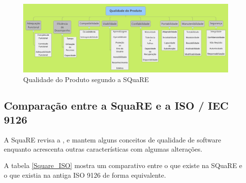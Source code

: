 \begin{landscape}
\begin{figure}[h]
\centering
\includegraphics[keepaspectratio=true,scale=0.55]{figuras/QualidadeProduto.png}
\caption{Qualidade do Produto segundo a SQuaRE \cite{iso_25010}  }
\label{Qualidade_Produto}
\end{figure}
\end{landscape}

\subsection{Comparação entre a SquaRE e a ISO / IEC 9126 }

A SquaRE revisa a , e mantem alguns conceitos de qualidade de software enquanto acrescenta outras características com algumas alterações.
 
 
A tabela \ref{Square_ISO} mostra um comparativo entre o que existe na SQuaRE e o que existia na antiga ISO 9126 de forma equivalente.  

